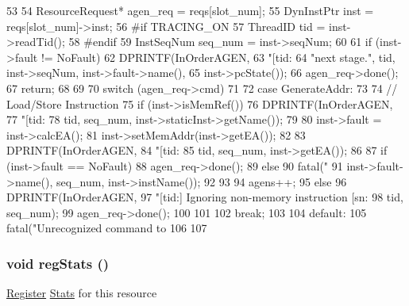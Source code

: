 \begin{DoxyCode}
53 {
54     ResourceRequest* agen_req = reqs[slot_num];
55     DynInstPtr inst = reqs[slot_num]->inst;
56 #if TRACING_ON
57     ThreadID tid = inst->readTid();
58 #endif
59     InstSeqNum seq_num = inst->seqNum;
60 
61     if (inst->fault != NoFault) {
62         DPRINTF(InOrderAGEN,
63                 "[tid:%
64                 "next stage.\n", tid, inst->seqNum, inst->fault->name(),
65                 inst->pcState());
66         agen_req->done();
67         return;
68     }
69 
70     switch (agen_req->cmd)
71     {
72       case GenerateAddr:
73         {
74             // Load/Store Instruction
75             if (inst->isMemRef()) {
76                 DPRINTF(InOrderAGEN,
77                         "[tid:%
78                         tid, seq_num, inst->staticInst->getName());
79 
80                 inst->fault = inst->calcEA();
81                 inst->setMemAddr(inst->getEA());
82 
83                 DPRINTF(InOrderAGEN,
84                     "[tid:%
85                     tid, seq_num, inst->getEA());
86 
87                 if (inst->fault == NoFault) {
88                     agen_req->done();
89                 } else {
90                     fatal("%
91                           inst->fault->name(), seq_num, inst->instName());
92                 }
93 
94                 agens++;
95             } else {
96                 DPRINTF(InOrderAGEN,
97                         "[tid:] Ignoring non-memory instruction [sn:%
98                         tid, seq_num);
99                 agen_req->done();
100             }
101         }
102         break;
103 
104       default:
105         fatal("Unrecognized command to %
106     }
107 }
\end{DoxyCode}
\hypertarget{classAGENUnit_a4dc637449366fcdfc4e764cdf12d9b11}{
\subsubsection[{regStats}]{\setlength{\rightskip}{0pt plus 5cm}void regStats ()}}
\label{classAGENUnit_a4dc637449366fcdfc4e764cdf12d9b11}
\hyperlink{classRegister}{Register} \hyperlink{namespaceStats}{Stats} for this resource 


